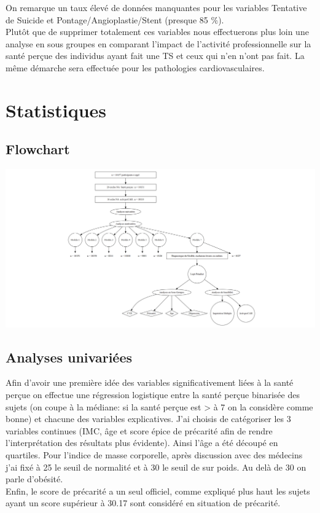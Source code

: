\documentclass{book}
\begin{document}
\bigskip
\noindent
On remarque un taux élevé de données manquantes pour les variables Tentative de Suicide et Pontage/Angioplastie/Stent (presque 85 $\%$).\\
Plutôt que de supprimer totalement ces variables nous effectuerons plus loin une analyse en sous groupes en comparant l'impact de l'activité professionnelle sur la santé perçue des individus ayant fait une TS et ceux qui n'en n'ont pas fait. La même démarche sera effectuée pour les pathologies cardiovasculaires. \\


\newpage
\section{Statistiques}
\subsection{Flowchart}

\begin{center}
\includegraphics[scale=.25]{FLOWCHART.png}
\end{center}


\subsection{Analyses univariées}
\noindent
Afin d'avoir une première idée des variables significativement liées à la santé perçue on effectue une régression logistique entre la santé perçue binarisée des sujets (on coupe à la médiane: si la santé perçue est > à 7 on la considère comme bonne) et chacune des variables explicatives.
J'ai choisis de catégoriser les 3 variables continues (IMC, âge et score épice de précarité afin de rendre l'interprétation des résultats plus évidente).
Ainsi l'âge a été découpé en quartiles. Pour l'indice de masse corporelle, après discussion avec des médecins j'ai fixé à 25 le seuil de normalité et à 30 le seuil de sur poids. Au delà de 30 on parle d'obésité.\\
Enfin, le score de précarité a un seul officiel, comme expliqué plus haut les sujets ayant un score supérieur à 30.17 sont considéré en situation de précarité.\\
\end{document}
